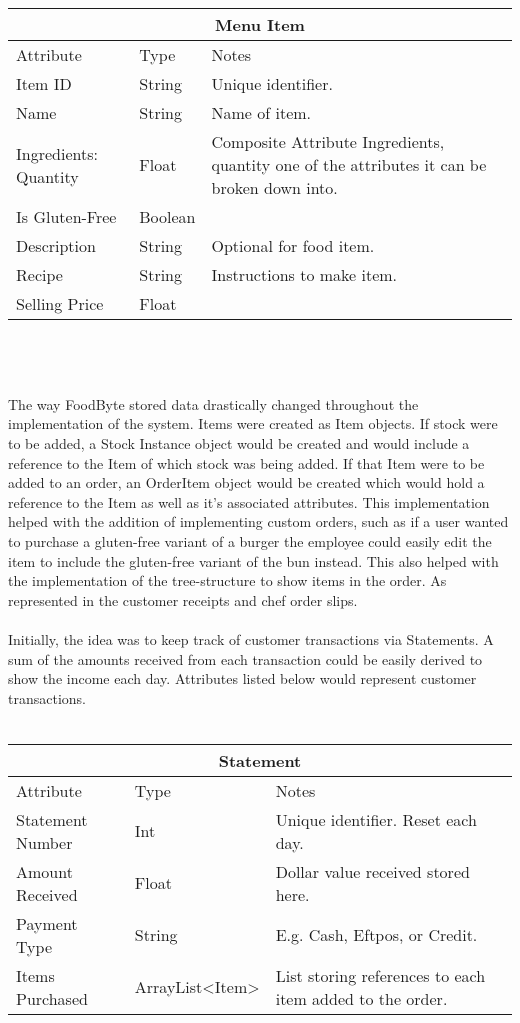 \begin{tabularx}{\linewidth}{|X|X|X|}
	\hline
	\multicolumn{3}{c}{ Menu Item } \\
	\hline
	Attribute & Type & Notes \\
	\hline
	Item ID & String & Unique identifier. \\
	\hline
	Name & String & Name of item. \\
	\hline
	Ingredients: Quantity & Float & Composite Attribute Ingredients, quantity one of the attributes it can be broken down into. \\
	\hline
	Is Gluten-Free & Boolean &  \\
	\hline
	Description & String & Optional for food item. \\
	\hline
	Recipe & String & Instructions to make item. \\
	\hline
	Selling Price & Float &   \\
	\hline
\end{tabularx} 
\\ \\ \\
\noindent The way FoodByte stored data drastically changed throughout the implementation of the system. Items were created as Item objects. If stock were to be added, a Stock Instance object would be created and would include a reference to the Item of which stock was being added. If that Item were to be added to an order, an OrderItem object would be created which would hold a reference to the Item as well as it's associated attributes. This implementation helped with the addition of implementing custom orders, such as if a user wanted to purchase a gluten-free variant of a burger the employee could easily edit the item to include the gluten-free variant of the bun instead. This also helped with the implementation of the tree-structure to show items in the order. As represented in the customer receipts and chef order slips.
\\ \\
Initially, the idea was to keep track of customer transactions via Statements. A sum of the amounts received from each transaction could be easily derived to show the income each day. Attributes listed below would represent customer transactions.
\\ \\
\begin{tabularx}{\linewidth}{|X|X|X|}
	\hline
	\multicolumn{3}{c}{ Statement } \\
	\hline
	Attribute & Type & Notes \\
	\hline
	Statement Number & Int & Unique identifier. Reset each day. \\
	\hline
	Amount Received & Float & Dollar value received stored here. \\
	\hline
	Payment Type & String & E.g. Cash, Eftpos, or Credit. \\
	\hline
	Items Purchased & ArrayList<Item> & List storing references to each item added to the order. \\
	\hline
\end{tabularx} 

